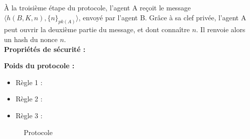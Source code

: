 \documentclass[10pt,a4paper]{article}
\begin{document}
À la troisième étape du protocole, l'agent A reçoit le message $\langle h(B, K, n), \{n\}_{pk(A)} \rangle $, envoyé par l'agent B.
Grâce à sa clef privée, l'agent A peut ouvrir la deuxième partie du message, et dont connaître $n$.
Il renvoie alors un hash du nonce $n$. \\


\textbf{Propriétés de sécurité :}

\textbf{Poids du protocole :}
\begin{itemize}
\item Règle 1 : 
\item Règle 2 :
\item Règle 3 :
\end{itemize}



\begin{figure}[!ht]
\centering
\begin{msc}{Protocole}
  \nextlevel
  \nextlevel[2]
  \nextlevel
  \nextlevel[2]
  \nextlevel
  \nextlevel
\end{msc}
\end{figure}










\end{document}
